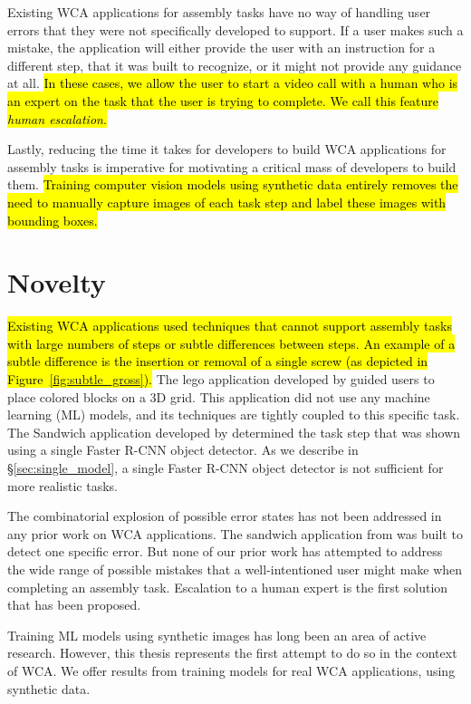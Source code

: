 Existing WCA applications for assembly tasks have no way of handling user
errors that they were not specifically developed to support.
If a user makes such a mistake, the application will either provide
the user with an instruction for a different step, that it was built to
recognize, or it might not provide any guidance at all.
\hl{In these cases, we allow the user to start a video call with a human who is
  an expert on the task that the user is trying to complete.
  We call this feature \emph{human escalation}.
}

Lastly, reducing the time it takes for developers to build WCA applications for
assembly tasks is imperative for motivating a critical mass of developers to
build them.
\hl{
  Training computer vision models using synthetic data entirely removes the need
  to manually capture
  images of each task step and label these images with bounding boxes.
}

\section{Novelty}

\hl{
  Existing WCA applications used techniques that cannot support assembly tasks
  with large numbers of steps or subtle differences between steps.
  An example of a subtle difference is the insertion or removal of a single
  screw (as depicted in Figure~{\ref{fig:subtle_gross}}).
}
The lego application developed by \citet{chen2017} guided users to place colored
blocks on a 3D grid.
This application did not use any machine learning (ML) models, and its
techniques are tightly coupled to this specific task.
The Sandwich application developed by \citet{chen2017} determined the task step
that was shown using a single Faster R-CNN object detector.
As we describe in \S\ref{sec:single_model}, a single Faster R-CNN object
detector is not sufficient for more realistic tasks.

The combinatorial explosion of possible error states has not been addressed in
any prior work on WCA applications.
The sandwich application from \citet{chen2017} was built to detect one specific
error.
But none of our prior work has attempted to address the wide range of possible
mistakes that a well-intentioned user might make when completing an assembly
task.
Escalation to a human expert is the first solution that has been proposed.

Training ML models using synthetic images has long been an area of active
research.
However, this thesis represents the first attempt to do so in the context of
WCA.
We offer results from training models for real WCA applications, using synthetic
data.

